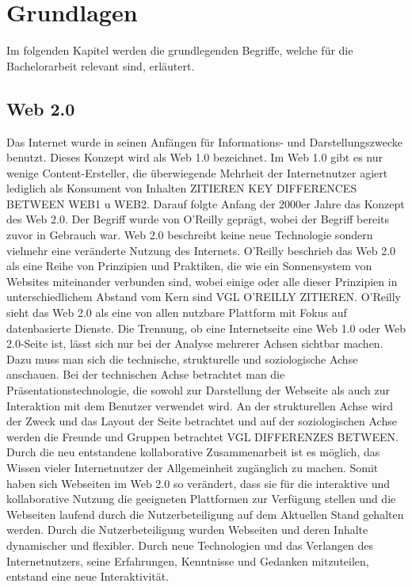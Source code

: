 \chapter{Grundlagen}
\label{ch:Grundlagen}

Im folgenden Kapitel werden die grundlegenden Begriffe, welche für die Bachelorarbeit relevant sind, erläutert. 

\section{Web 2.0}
\label{web2.0}

Das Internet wurde in seinen Anfängen für Informations- und Darstellungszwecke benutzt. Dieses Konzept wird als Web 1.0 bezeichnet. Im Web 1.0 gibt es nur wenige Content-Ersteller, die überwiegende Mehrheit der Internetnutzer agiert lediglich als Konsument von Inhalten ZITIEREN KEY DIFFERENCES BETWEEN WEB1 u WEB2. Darauf folgte Anfang der 2000er Jahre das Konzept des Web 2.0. Der Begriff wurde von O'Reilly geprägt, wobei der Begriff bereits zuvor in Gebrauch war. Web 2.0 beschreibt keine neue Technologie sondern vielmehr eine veränderte Nutzung des Internets. O'Reilly beschrieb das Web 2.0 als eine Reihe von Prinzipien und Praktiken, die wie ein Sonnensystem von Websites miteinander verbunden sind, wobei einige oder alle dieser Prinzipien in unterschiedlichem Abstand vom Kern sind VGL O'REILLY ZITIEREN. O'Reilly sieht das Web 2.0 als eine von allen nutzbare Plattform mit Fokus auf datenbasierte Dienste.
Die Trennung, ob eine Internetseite eine Web 1.0 oder Web 2.0-Seite ist, lässt sich nur bei der Analyse mehrerer Achsen sichtbar machen. Dazu muss man sich die technische, strukturelle und soziologische Achse anschauen. Bei der technischen Achse betrachtet man die Präsentationstechnologie, die sowohl zur Darstellung der Webseite als auch zur Interaktion mit dem Benutzer verwendet wird. An der strukturellen Achse wird der Zweck und das Layout der Seite betrachtet und auf der soziologischen Achse werden die Freunde und Gruppen betrachtet VGL DIFFERENZES BETWEEN. \\
Durch die neu entstandene kollaborative Zusammenarbeit ist es möglich, das Wissen vieler Internetnutzer der Allgemeinheit zugänglich zu machen. Somit haben sich Webseiten im Web 2.0 so verändert, dass sie für die interaktive und kollaborative Nutzung die geeigneten Plattformen zur Verfügung stellen und die Webseiten laufend durch die Nutzerbeteiligung auf dem Aktuellen Stand gehalten werden. Durch die Nutzerbeteiligung wurden Webseiten und deren Inhalte dynamischer und flexibler.
Durch neue Technologien und das Verlangen des Internetnutzers, seine Erfahrungen, Kenntnisse und Gedanken mitzuteilen, entstand eine neue Interaktivität.



